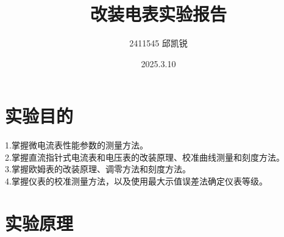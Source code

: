 \documentclass{article}
\title{改装电表实验报告}
\author{2411545 邱凯锐}
\date{2025.3.10}
\begin{document}
\maketitle
\section{实验目的}
\hspace*{1em}1.掌握微电流表性能参数的测量方法。\\
\hspace*{1em}2.掌握直流指针式电流表和电压表的改装原理、校准曲线测量和刻度方法。\\
\hspace*{1em}3.掌握欧姆表的改装原理、调零方法和刻度方法。\\
\hspace*{1em}4.掌握仪表的校准测量方法，以及使用最大示值误差法确定仪表等级。

\section{实验原理}
\end{document}
